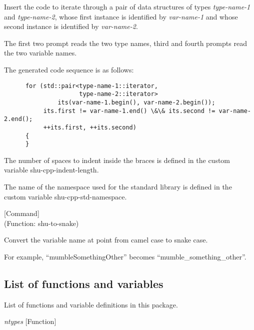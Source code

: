 \begin{doc-string}
Insert the code to iterate through a pair of data structures of types
\emph{type-name-1} and \emph{type-name-2}, whose first instance is identified by \emph{var-name-1}
and whose second instance is identified by \emph{var-name-2}.

The first two prompt reads the two type names, third and fourth prompts read the
two variable names.

The generated code sequence is as follows:

\small{\begin{verbatim}
      for (std::pair<type-name-1::iterator,
                     type-name-2::iterator>
               its(var-name-1.begin(), var-name-2.begin());
           its.first != var-name-1.end() \&\& its.second != var-name-2.end();
           ++its.first, ++its.second)
      {
      }
\end{verbatim}}

The number of spaces to indent inside the braces is defined in the custom
variable shu-cpp-indent-length.

The name of the namespace used for the standard library is defined in the custom
variable shu-cpp-std-namespace.
\end{doc-string}

\vspace{1em}
\noindent
{}
\usebox{\funcname}
 \hfill [Command]\\%
 (Function: shu-to-snake)

\begin{doc-string}
Convert the variable name at point from camel case to snake case.

For example, ``mumbleSomethingOther'' becomes ``mumble\_something\_other''.
\end{doc-string}

\subsection{List of functions and variables}

List of functions and variable definitions in this package.



\vspace{1em}
\noindent
{}
\usebox{\funcname}\emph{ntypes}
 \hfill [Function]

